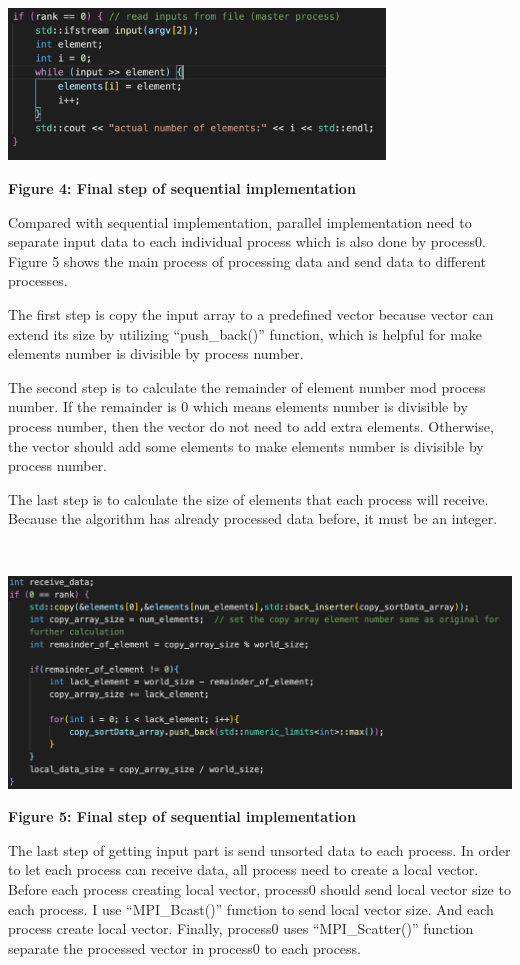 ~\\
\centerline {\includegraphics[scale = 1, width=10cm]{para_input1}}
\centerline{\textbf {Figure 4: Final step of sequential implementation}}

Compared with sequential implementation, parallel implementation need to separate input data to each individual process which is also done by process0. Figure 5 shows the main process of processing data and send data to different processes. 

The first step is copy the input array to a predefined vector because vector can extend its size by utilizing “push\_back()” function, which is helpful for make elements number is divisible by process number.

The second step is to calculate the remainder of element number mod process number. If the remainder is 0 which means elements number is divisible by process number, then the vector do not need to add extra elements. Otherwise, the vector should add some elements to make elements number is divisible by process number.

The last step is to calculate the size of elements that each process will receive. Because the algorithm has already processed data before, it must be an integer.

~\\
\centerline {\includegraphics[scale = 1, width=14cm]{para_input2}}
\centerline{\textbf {Figure 5: Final step of sequential implementation}}

The last step of getting input part is send unsorted data to each process. In order to let each process can receive data, all process need to create a local vector. Before each process creating local vector, process0 should send local vector size to each process. I use “MPI\_Bcast()” function to send local vector size. And each process create local vector. Finally, process0 uses “MPI\_Scatter()” function separate the processed vector in process0 to each process.

